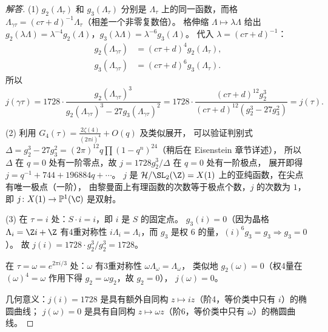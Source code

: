 \begin{proof}[解答]
(1) $g_2(\Lambda_\tau)$ 和 $g_3(\Lambda_\tau)$ 分别是 $\Lambda_\tau$ 上的同一函数，而格 $\Lambda_{\gamma\tau} = (c\tau+d)^{-1}\Lambda_\tau$（相差一个非零复数倍）。
格伸缩 $\Lambda \mapsto \lambda\Lambda$ 给出 $g_2(\lambda\Lambda) = \lambda^{-4}g_2(\Lambda)$，$g_3(\lambda\Lambda) = \lambda^{-6}g_3(\Lambda)$。
代入 $\lambda = (c\tau+d)^{-1}$：
\begin{align*}
  g_2(\Lambda_{\gamma\tau}) &= (c\tau+d)^4 g_2(\Lambda_\tau),\\
  g_3(\Lambda_{\gamma\tau}) &= (c\tau+d)^6 g_3(\Lambda_\tau).
\end{align*}
所以
\[
  j(\gamma\tau) = 1728\cdot\frac{g_2(\Lambda_{\gamma\tau})^3}{g_2(\Lambda_{\gamma\tau})^3 - 27g_3(\Lambda_{\gamma\tau})^2}
  = 1728\cdot\frac{(c\tau+d)^{12}g_2^3}{(c\tau+d)^{12}(g_2^3 - 27g_3^2)}
  = j(\tau).
\]

(2) 利用 $G_4(\tau) = \frac{2\zeta(4)}{(2\pi i)^4} + O(q)$ 及类似展开，
可以验证判别式 $\Delta = g_2^3 - 27g_3^2 = (2\pi)^{12}q\prod(1-q^n)^{24}$（稍后在 Eisenstein 章节详述），
所以 $\Delta$ 在 $q = 0$ 处有一阶零点，故 $j = 1728 g_2^3/\Delta$ 在 $q=0$ 处有一阶极点，
展开即得 $j = q^{-1} + 744 + 196884q + \cdots$。
$j$ 是 $\mathcal{H}/\SL_2(\Z) = X(1)$ 上的亚纯函数，在尖点有唯一极点（一阶），
由黎曼面上有理函数的次数等于极点个数，$j$ 的次数为 $1$，即 $j \colon X(1) \to \mathbb{P}^1(\C)$ 是双射。

(3) 在 $\tau = i$ 处：$S \cdot i = i$，即 $i$ 是 $S$ 的固定点。
$g_3(i) = 0$（因为晶格 $\Lambda_i = \Z i + \Z$ 有4重对称性 $i\Lambda_i = \Lambda_i$，而 $g_3$ 是权 $6$ 的量，$(i)^6 g_3 = g_3 \Rightarrow g_3 = 0$）。
故 $j(i) = 1728 \cdot g_2^3/g_2^3 = 1728$。

在 $\tau = \omega = e^{2\pi i/3}$ 处：$\omega$ 有3重对称性 $\omega\Lambda_\omega = \Lambda_\omega$，
类似地 $g_2(\omega) = 0$（权4量在 $(\omega)^4 = \omega$ 作用下得 $g_2 = \omega g_2$，故 $g_2=0$），
$j(\omega) = 0$。

几何意义：$j(i) = 1728$ 是具有额外自同构 $z \mapsto iz$（阶4，等价类中只有 $i$）的椭圆曲线；
$j(\omega) = 0$ 是具有自同构 $z \mapsto \omega z$（阶6，等价类中只有 $\omega$）的椭圆曲线。
\end{proof}

